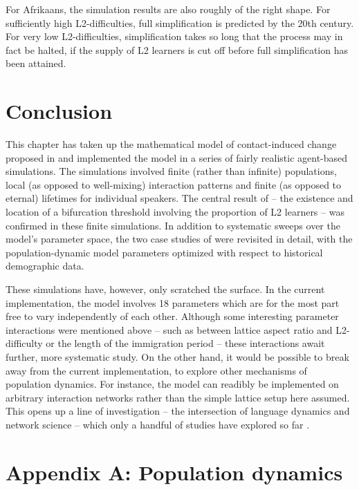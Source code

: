 For Afrikaans, the simulation results are also roughly of the right
shape. For sufficiently high L2-difficulties, full simplification is
predicted by the 20th century. For very low L2-difficulties,
simplification takes so long that the process may in fact be halted, if
the supply of L2 learners is cut off before full simplification has been
attained.

\hypertarget{sec:discussion}{%
\section{Conclusion}\label{sec:discussion}}

This chapter has taken up the mathematical model of contact-induced
change proposed in \textcite{Kauhanen2022} and implemented the model in
a series of fairly realistic agent-based simulations. The simulations
involved finite (rather than infinite) populations, local (as opposed to
well-mixing) interaction patterns and finite (as opposed to eternal)
lifetimes for individual speakers. The central result of
\textcite{Kauhanen2022} -- the existence and location of a bifurcation
threshold involving the proportion of L2 learners -- was confirmed in
these finite simulations. In addition to systematic sweeps over the
model's parameter space, the two case studies of \textcite{Kauhanen2022}
were revisited in detail, with the population-dynamic model parameters
optimized with respect to historical demographic data.

These simulations have, however, only scratched the surface. In the
current implementation, the model involves 18 parameters which are for
the most part free to vary independently of each other. Although some
interesting parameter interactions were mentioned above -- such as
between lattice aspect ratio and L2-difficulty or the length of the
immigration period -- these interactions await further, more systematic
study. On the other hand, it would be possible to break away from the
current implementation, to explore other mechanisms of population
dynamics. For instance, the model can readibly be implemented on
arbitrary interaction networks rather than the simple lattice setup here
assumed. This opens up a line of investigation -- the intersection of
language dynamics and network science -- which only a handful of studies
have explored so far
\autocites[e.g.][]{KeGonWan2008,FagEtal2010,Kau2017,Josserand2021}.

\hypertarget{appendix-a-population-dynamics}{%
\section*{Appendix A: Population
dynamics}\label{appendix-a-population-dynamics}}

